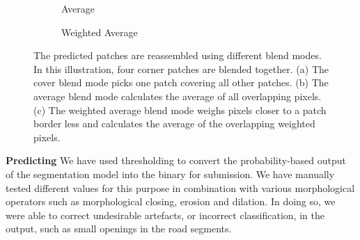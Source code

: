\documentclass[10pt,conference,compsocconf]{IEEEtran}
\begin{document}
\begin{figure}[h]
\begin{subfigure}[t]{.3\columnwidth}
        \caption{Average}
        \label{fig:average}
    \end{subfigure}
    \hfill
    \begin{subfigure}[t]{.3\columnwidth}
        \caption{Weighted Average}
        \label{fig:weighted_average}
    \end{subfigure}
    
    \caption{The predicted patches are reassembled using different blend modes. In this illustration, four corner patches are blended together. (a) The cover blend mode picks one patch covering all other patches. (b) The average blend mode calculates the average of all overlapping pixels. (c) The weighted average blend mode weighs pixels closer to a patch border less and calculates the average of the overlapping weighted pixels.}
    \label{fig:test_time_augmentation}
\end{figure}


\textbf{Predicting}
We have used thresholding to convert the probability-based output of the segmentation model into the binary for submission. We have manually tested different values for this purpose in combination with various morphological operators such as morphological closing, erosion and dilation. In doing so, we were able to correct undesirable artefacts, or incorrect classification, in the output, such as small openings in the road segments. 
\end{document}
